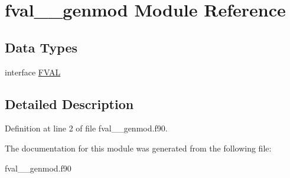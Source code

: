 \hypertarget{classfval____genmod}{\section{fval\+\_\+\+\_\+genmod Module Reference}
\label{classfval____genmod}
}
\subsection*{Data Types}
\begin{DoxyCompactItemize}
\item 
interface \hyperlink{interfacefval____genmod_1_1_f_v_a_l}{F\+V\+A\+L}
\end{DoxyCompactItemize}


\subsection{Detailed Description}


Definition at line 2 of file fval\+\_\+\+\_\+genmod.\+f90.



The documentation for this module was generated from the following file\+:\begin{DoxyCompactItemize}
\item 
fval\+\_\+\+\_\+genmod.\+f90\end{DoxyCompactItemize}
